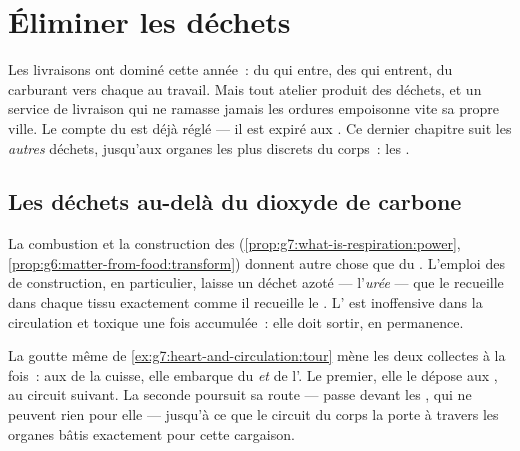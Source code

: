 \chapter{Éliminer les déchets}\label{ch:g7:removing-wastes}

Les livraisons ont dominé cette année~: du  qui entre, des
 qui entrent, du carburant vers chaque  au travail.
Mais tout atelier produit des déchets, et un service de livraison
qui ne ramasse jamais les ordures empoisonne vite sa propre ville.
Le compte du  est déjà réglé --- il est expiré aux
. Ce dernier chapitre suit les \emph{autres} déchets,
jusqu'aux organes les plus discrets du corps~: les .

\section{Les déchets au-delà du dioxyde de carbone}

\begin{proposition}\label{prop:g7:removing-wastes:rubbish}
La combustion et la construction des 
(\cref{prop:g7:what-is-respiration:power},
\cref{prop:g6:matter-from-food:transform}) donnent autre chose que
du . L'emploi des  de construction, en
particulier, laisse un déchet azoté --- l'\emph{urée} ---
que le  recueille dans chaque tissu exactement comme il recueille
le . L' est inoffensive dans la circulation
et toxique une fois accumulée~: elle doit sortir, en permanence.
\end{proposition}
\admitted

\begin{example}\label{ex:g7:removing-wastes:rounds}
La goutte même de \cref{ex:g7:heart-and-circulation:tour} mène les
deux collectes à la fois~: aux  de la cuisse, elle embarque
du  \emph{et} de l'. Le premier, elle le dépose
aux , au circuit suivant. La seconde poursuit sa route ---
passe devant les , qui ne peuvent rien pour elle --- jusqu'à
ce que le circuit du corps la porte à travers les organes bâtis
exactement pour cette cargaison.
\end{example}

